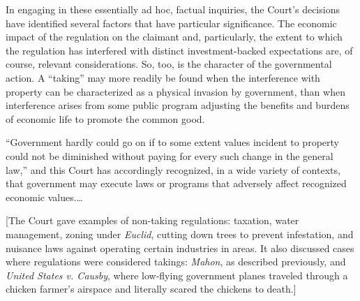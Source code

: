 In engaging in these essentially ad hoc, factual inquiries, the Court's
decisions have identified several factors that have particular significance. The
economic impact of the regulation on the claimant and, particularly, the extent
to which the regulation has interfered with distinct investment-backed
expectations are, of course, relevant considerations. So, too, is the character
of the governmental action. A ``taking'' may more readily be found when the
interference with property can be characterized as a physical invasion by
government, than when interference arises from some public program adjusting the
benefits and burdens of economic life to promote the common good.

``Government hardly could go on if to some extent values incident to property
could not be diminished without paying for every such change in the general
law,'' and
this Court has accordingly recognized, in a wide variety of contexts, that
government may execute laws or programs that adversely affect recognized
economic values.\ldots

[The Court gave examples of non-taking regulations: taxation, water management,
zoning under \emph{Euclid}, cutting down trees to prevent infestation, and
nuisance laws against operating certain industries in areas. It also discussed
cases where regulations were considered takings: \emph{Mahon}, as described
previously, and \emph{United States v. Causby}, where low-flying government
planes traveled through a chicken farmer's airspace and literally scared the
chickens to death.]



